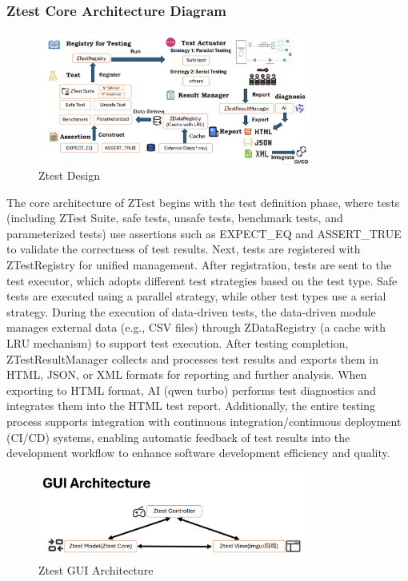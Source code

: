 \documentclass{article}
\begin{document}
\subsubsection{Ztest Core Architecture Diagram}
\begin{figure}[H]
    \centering
    \includegraphics[width=0.8\textwidth]{img/core.png} %
    \caption{ Ztest Design}
    \label{fig:ztest design }
\end{figure}
The core architecture of ZTest begins with the test definition phase, where tests (including ZTest Suite, safe tests, unsafe tests, benchmark tests, and parameterized tests) use assertions such as EXPECT\_EQ and ASSERT\_TRUE to validate the correctness of test results.
Next, tests are registered with ZTestRegistry for unified management.
After registration, tests are sent to the test executor, which adopts different test strategies based on the test type. Safe tests are executed using a parallel strategy, while other test types use a serial strategy.
During the execution of data-driven tests, the data-driven module manages external data (e.g., CSV files) through ZDataRegistry (a cache with LRU mechanism) to support test execution.
After testing completion, ZTestResultManager collects and processes test results and exports them in HTML, JSON, or XML formats for reporting and further analysis.
When exporting to HTML format, AI (qwen turbo) performs test diagnostics and integrates them into the HTML test report.
Additionally, the entire testing process supports integration with continuous integration/continuous deployment (CI/CD) systems, enabling automatic feedback of test results into the development workflow to enhance software development efficiency and quality.
\begin{figure}[H]
    \centering
    \includegraphics[width=0.8\textwidth]{img/guiarch.png} %
    \caption{ Ztest GUI Architecture}
    \label{fig:ztest gui architecture }
\end{figure}
\end{document}
